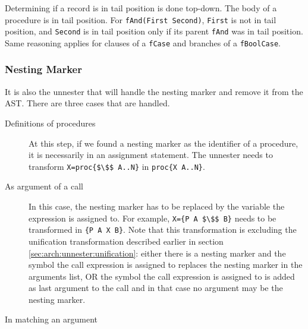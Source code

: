 \documentclass[a4paper]{memoir}
\begin{document}
Determining if a record is in tail position is done top-down.
The body of a procedure is in tail position. For \lstinline!fAnd(First Second)!,
\lstinline!First! is not in tail position, and \lstinline!Second! is in tail
position only if its parent \lstinline!fAnd! was in tail position.
Same reasoning applies for clauses of a \lstinline!fCase! and branches of a
\lstinline!fBoolCase!.



\subsubsection{Nesting Marker}\label{sec:arch:unnester:nestingmarker}
It is also the unnester that will handle the nesting marker and remove it from the AST. There are three cases that are handled.
\begin{description}
  \item[Definitions of procedures] At this step, if we found a nesting marker as the identifier of a procedure, it is necessarily in an assignment statement. The unnester needs to transform \lstinline[mathescape]!X=proc{$\$$ A..N}! in \lstinline!proc{X A..N}!.
  \item[As argument of a call] In this case, the nesting marker has to be replaced by the variable the expression is assigned to. For example, \lstinline[mathescape]!X={P A $\$$ B}! needs to be transformed in  \lstinline!{P A X B}!. Note that this transformation is excluding the unification transformation described earlier in section \ref{sec:arch:unnester:unification}: either there is a nesting marker and the symbol the call expression is assigned to replaces the nesting marker in the arguments list, OR the symbol the call expression is assigned to is added as last argument to the call and in that case no argument may be the nesting marker.
  \item[In matching an argument] %
\end{description}
\end{document}
